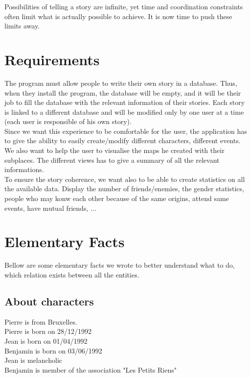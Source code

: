 \documentclass[a4paper ,12pt,french]{article}
\begin{document}
Possibilities of telling a story are infinite, yet time and coordination constraints often limit what is actually possible to achieve. It is now time to push these limits away.

\section{Requirements} 
 The program must allow people to write their own story in a database. Thus, when they install the program, the database will be empty, and it will be their job to fill the database with the relevant information of their stories. Each story is linked to a different database and will be modified only by one user at a time (each user is responsible of his own story).\\

Since we want this experience to be comfortable for the user, the application has to give the ability to easily create/modify different characters, different events. We also want to help the user to visualise the maps he created with their subplaces.
The different views has to give a summary of all the relevant informations.\\

To ensure the story coherence, we want also to be able to create statistics on all the available data. Display the number of friends/enemies, the gender statistics, people who may konw each other because of the same origins, attend same events, have mutual friends, ...
 
 
\section{Elementary Facts}

Bellow are some elementary facts we wrote to better understand what to do, which relation exists between all the entities.

\subsection{About characters}

\noindent Pierre is from Bruxelles.\\
Pierre is born on 28/12/1992\\
Jean is born on 01/04/1992\\
Benjamin is born on 03/06/1992\\
Jean is melancholic\\
Benjamin is member of the association "Les Petits Riens"
\end{document}
